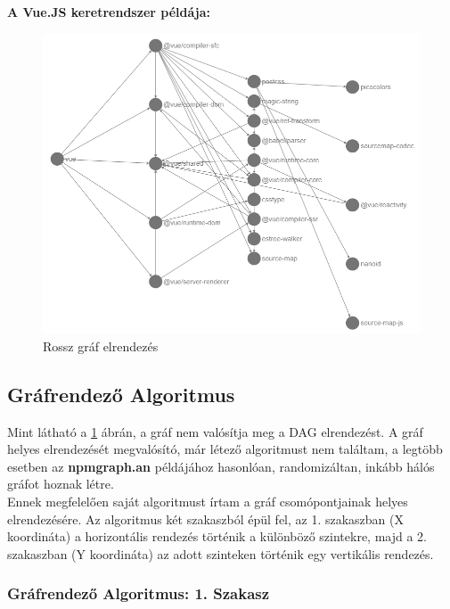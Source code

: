 \textbf{A Vue.JS keretrendszer példája:}

\begin{figure}[!h]
	\centering
	\includegraphics[scale=0.35]{images/graph_wrong.png}
	\caption{Rossz gráf elrendezés}
	\label{fig:graph_wrong}
\end{figure}

\pagebreak

\subsection{Gráfrendező Algoritmus}
Mint látható a \ref{fig:graph_wrong} ábrán, a gráf nem valósítja meg a DAG elrendezést. A gráf helyes elrendezését megvalósító, már létező algoritmust nem találtam, a legtöbb esetben az \textbf{npmgraph.an} példájához hasonlóan, randomizáltan, inkább hálós gráfot hoznak létre. \\

Ennek megfelelően saját algoritmust írtam a gráf csomópontjainak helyes elrendezésére. Az algoritmus két szakaszból épül fel, az 1. szakaszban (X koordináta) a horizontális rendezés történik a különböző szintekre, majd a 2. szakaszban (Y koordináta) az adott szinteken történik egy vertikális rendezés. 

\subsubsection{Gráfrendező Algoritmus: 1. Szakasz}


